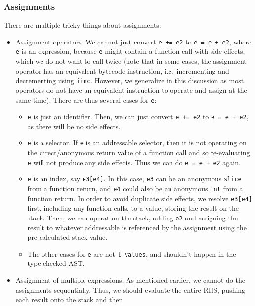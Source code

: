 \documentclass[11pt]{article}
\begin{document}
\subsubsection{Assignments}

There are multiple tricky things about assignments:

\begin{itemize}
\item Assignment operators. We cannot just convert \texttt{e += e2} to
  \texttt{e = e + e2}, where \texttt{e} is an expression, because
  \texttt{e} might contain a function call with side-effects, which we
  do not want to call twice (note that in some cases, the assignment
  operator has an equivalent bytecode instruction, i.e.\ incrementing
  and decrementing using \texttt{iinc}. However, we generalize in this
  discussion as most operators do not have an equivalent instruction
  to operate and assign at the same time). There are thus several
  cases for \texttt{e}:
  \begin{itemize}
  \item \texttt{e} is just an identifier. Then, we can just convert
    \texttt{e += e2} to \texttt{e = e + e2}, as there will be no side
    effects.
  \item \texttt{e} is a selector. If \texttt{e} is an addressable
    selector, then it is not operating on the direct/anonymous return
    value of a function call and so re-evaluating \texttt{e} will not
    produce any side effects. Thus we can do \texttt{e = e + e2}
    again.
  \item \texttt{e} is an index, say \texttt{e3[e4]}. In this case,
    \texttt{e3} can be an anonymous \texttt{slice} from a function
    return, and \texttt{e4} could also be an anonymous \texttt{int}
    from a function return. In order to avoid duplicate side effects,
    we resolve \texttt{e3[e4]} first, including any function calls,
    to a value, storing the result on the stack. Then, we can operat
    on the stack, adding \texttt{e2} and assigning the result to whatever
    addressable is referenced by the assignment using the pre-calculated
    stack value.
  \item The other cases for \texttt{e} are not \texttt{l-values}, and
    shouldn't happen in the type-checked AST.\@
  \end{itemize}
  \item Assignment of multiple expressions. As mentioned earlier, we
    cannot do the assignments sequentially. Thus, we should evaluate
    the entire RHS, pushing each result onto the stack and then

\end{itemize}
\end{document}
